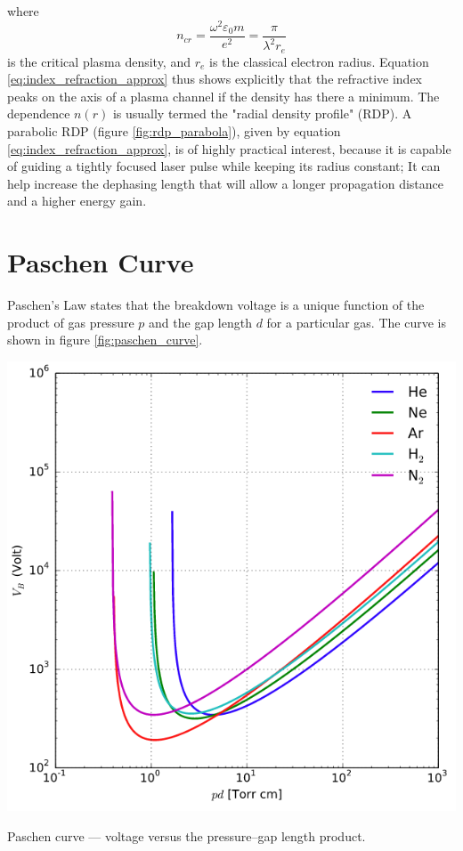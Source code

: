 \documentclass[justified,nofonts,nobib]{tufte-book}
\begin{document}
where
\begin{equation}
n_{cr}=\frac{\omega^2 \varepsilon_0 m}{e^2}=\frac{\pi}{\lambda^2 r_e} \label{eq:critical_density}
\end{equation}
is the critical plasma density, and $r_e$ is the classical electron radius. Equation \ref{eq:index_refraction_approx} thus shows explicitly that the refractive index peaks on the axis of a plasma channel if the density has there a minimum. 
The dependence $n(r)$ is usually termed the "radial density profile" (RDP). A parabolic RDP (figure \ref{fig:rdp_parabola}), given by equation \ref{eq:index_refraction_approx}, is of highly practical interest, because it is capable \cite{Sprangle1992,Sprangle2000} of guiding a tightly focused laser pulse while keeping its radius constant; It can help increase the dephasing length that will allow a longer propagation distance and a higher energy gain. 

\section{Paschen Curve}\label{sec:paschen}
Paschen's Law states that the breakdown voltage is a unique function of the product of gas pressure $p$ and the gap length $d$ for a particular gas. The curve is shown in figure \ref{fig:paschen_curve}.
\begin{marginfigure}
    \includegraphics[width=\marginparwidth]{figures/paschen_curve.PNG}
    \label{fig:paschen_curve}
    \caption{Paschen curve --- voltage versus the pressure--gap length product.}
\end{marginfigure}
\end{document}
